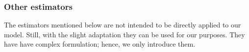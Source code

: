 \documentclass[sigconf,review,anonymous]{acmart}
\newcommand{\ChaoBunge}{Chao Bunge\xspace}
\newcounter{todocounter}
\newcommand{\todo}[1]{\marginpar{$|$}\textcolor{red}{\stepcounter{todocounter}\footnote[\thetodocounter]{\textcolor{red}{\textbf{TODO }}\textit{#1}}}}
\def\<#1>{\texttt{#1}}
\renewcommand{\todo}[1]{}
\begin{document}



\subsubsection{Other estimators}
The estimators mentioned below are not intended to be directly applied to our model.
Still, with the slight adaptation they can be used for our purposes.
They have have complex formulation; hence, we only introduce them.
\end{document}
